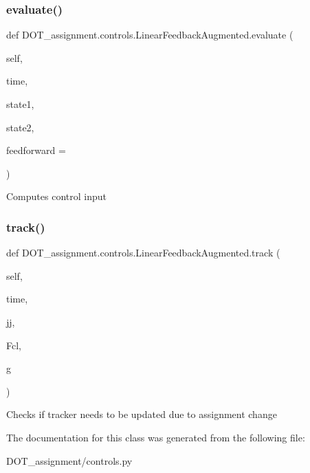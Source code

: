 \subsubsection{\texorpdfstring{evaluate()}{evaluate()}}
{\footnotesize\ttfamily def D\+O\+T\+\_\+assignment.\+controls.\+Linear\+Feedback\+Augmented.\+evaluate (\begin{DoxyParamCaption}\item[{}]{self,  }\item[{}]{time,  }\item[{}]{state1,  }\item[{}]{state2,  }\item[{}]{feedforward = {} }\end{DoxyParamCaption})}

\begin{DoxyVerb}Computes control input
\end{DoxyVerb}
 \mbox{\label{class_d_o_t__assignment_1_1controls_1_1_linear_feedback_augmented_ab52bf025cb9fdd7bb77e127f266a840f}} 
\subsubsection{\texorpdfstring{track()}{track()}}
{\footnotesize\ttfamily def D\+O\+T\+\_\+assignment.\+controls.\+Linear\+Feedback\+Augmented.\+track (\begin{DoxyParamCaption}\item[{}]{self,  }\item[{}]{time,  }\item[{}]{jj,  }\item[{}]{Fcl,  }\item[{}]{g }\end{DoxyParamCaption})}

\begin{DoxyVerb}Checks if tracker needs to be updated due to assignment change
\end{DoxyVerb}
 

The documentation for this class was generated from the following file\+:\begin{DoxyCompactItemize}
\item 
D\+O\+T\+\_\+assignment/controls.\+py\end{DoxyCompactItemize}
